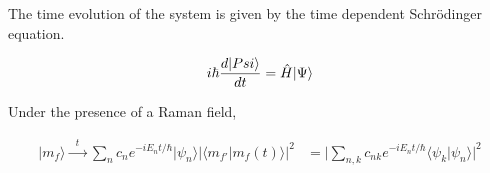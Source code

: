 The time evolution of the system is given by the time dependent Schr\"{o}dinger equation. 

\begin{align}
i\hbar\frac{d|Psi\rangle}{dt} = \hat{H}|\Psi\rangle
\end{align}

Under the presence of a Raman field, 

\begin{align}
\vert  m_f\rangle \xrightarrow{ \ \ \ t \ \ \  } \sum_nc_n e^{-iE_nt/\hbar}\vert \psi_n\rangle
\vert\langle m_{f'}\vert m_f(t)\rangle\vert^2 &= \vert\sum_{n,k}c_{nk} e^{-iE_nt/\hbar}\langle \psi_k \vert \psi_n\rangle\vert^2 \\
\end{align}

